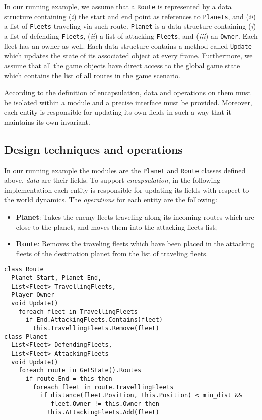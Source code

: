 In our running example, we assume that a \texttt{Route} is represented by a data structure containing (\textit{i}) the start and end point as references to \texttt{Planets}, and (\textit{ii}) a list of \texttt{Fleets} traveling via such route. \texttt{Planet} is a data structure containing (\textit{i}) a list of defending \texttt{Fleets}, (\textit{ii}) a list of attacking \texttt{Fleets}, and (\textit{iii}) an \texttt{Owner}. Each fleet has an owner as well. Each data structure contains a method called \texttt{Update} which updates the state of its associated object at every frame. Furthermore, we assume that all the game objects have direct access to the global game state which contains the list of all routes in the game scenario.



According to the definition of encapsulation, data and operations on them must be isolated within a module and a precise interface must be provided. Moreover, each entity is responsible for updating its own fields in such a way that it maintains its own invariant.

\subsection{Design techniques and operations}

In our running example the modules are the \texttt{Planet} and \texttt{Route} classes defined above, \textit{data} are their fields. To support \emph{encapsulation}, in the following implementation each entity is responsible for updating its fields with respect to the world dynamics. The \textit{operations} for each entity are the following:
\begin{itemize}
    \item[] \textbf{Planet}: Takes the enemy fleets traveling along its incoming routes which are close to the planet, and moves them into the attacking fleets list;
    \item[] \textbf{Route}: Removes the traveling fleets which have been placed in the attacking fleets of the destination planet from the list of traveling fleets.
\end{itemize}

\begin{lstlisting}
class Route
  Planet Start, Planet End,
  List<Fleet> TravellingFleets,
  Player Owner
  void Update()
    foreach fleet in TravellingFleets
      if End.AttackingFleets.Contains(fleet)
        this.TravellingFleets.Remove(fleet)
class Planet
  List<Fleet> DefendingFleets,
  List<Fleet> AttackingFleets
  void Update()
    foreach route in GetState().Routes
      if route.End = this then
        foreach fleet in route.TravellingFleets
          if distance(fleet.Position, this.Position) < min_dist && 
             fleet.Owner != this.Owner then
            this.AttackingFleets.Add(fleet)
\end{lstlisting}


